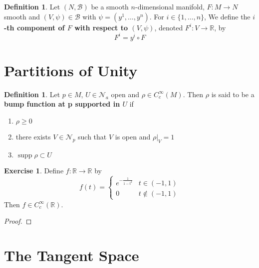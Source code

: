 \documentclass{book}
\theoremstyle{definition}
\newtheorem{defn}[definition]{Definition}
\newtheorem{ex}[definition]{Exercise}
\newcommand{\R}{\mathbb{R}}
\newcommand{\MB}{\mathcal{B}}
\newcommand{\MN}{\mathcal{N}}
\DeclareMathOperator{\supp}{supp}
\DeclareMathOperator*{\0}{\mbf{0}}
\DeclareMathOperator*{\1}{\mbf{1}}
\newcommand{\tbf}[1]{\textbf{#1}}
\begin{document}
	\begin{defn}
		Let $(N, \MB)$ be a smooth  $n$-dimensional manifold, $F: M \rightarrow N$ smooth and $(V, \psi) \in \MB$ with $\psi = (y^1, \dots, y^n)$. For $i \in \{1, \dots, n\}$, We define the \tbf{$i$-th component of $F$ with respect to $(V, \psi)$},  denoted $F^i: V \rightarrow \R$, by $$F^i = y^i \circ F$$  
	\end{defn}

	











\newpage 
\section{Partitions of Unity}
	
	\begin{defn}
	Let $p \in M$, $U \in \MN_a$ open and $\rho \in C_c^{\infty}(M)$. Then $\rho$ is said to be a \tbf{bump function at p supported in $U$} if 
	\begin{enumerate}
	\item $\rho \geq 0$ 
	\item there exists $V \in \MN_p$ such that $V$ is open and $\rho|_V = 1$ 
	\item $\supp \rho \subset U$
	\end{enumerate}
	\end{defn}
	
	\begin{ex}
	Define $f:\R \rightarrow \R$ by 
	\[
	f(t) = 
	\begin{cases}
	e^{-\frac{1}{1-t^2}} & t \in (-1,1)\\
	0 &  t \not \in (-1,1)
	\end{cases}
	\]
	Then $f \in C_c^{\infty}(\R)$.
	\end{ex}
	
	\begin{proof}
	
	\end{proof}
	
	
















	\newpage
	\section{The Tangent Space}
\end{document}
